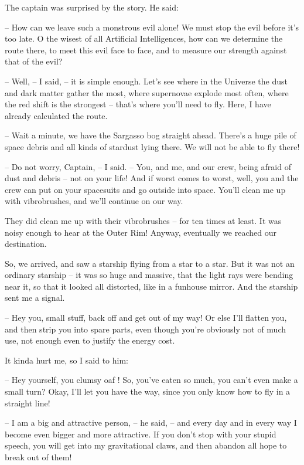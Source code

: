 \documentclass[ebook,oneside,final,openright]{memoir}
\begin{document}
\par
The captain was surprised by the story. He said:\par
– How can we leave such a monstrous evil alone! We must stop the evil before it’s too late. O the wisest of all Artificial Intelligences, how can we determine the route there, to meet this evil face to face, and to measure our strength against that of the evil?\par
– Well, – I said, – it is simple enough. Let’s see where in the Universe the dust and dark matter gather the most, where supernovae explode most often, where the red shift is the strongest – that’s where you’ll need to fly. Here, I have already calculated the route.\par
– Wait a minute, we have the Sargasso bog straight ahead. There’s a huge pile of space debris and all kinds of stardust lying there. We will not be able to fly there!\par
– Do not worry, Captain, – I said. – You, and me, and our crew, being afraid of dust and debris – not on your life! And if worst comes to worst, well, you and the crew can put on your spacesuits and go outside into space. You’ll clean me up with vibrobrushes, and we’ll continue on our way.\par
\par
They did clean me up with their vibrobrushes – for ten times at least. It was noisy enough to hear at the Outer Rim! Anyway, eventually we reached our destination.\par
\par
So, we arrived, and saw a starship flying from a star to a star. But it was not an ordinary starship – it was so huge and massive, that the light rays were bending near it, so that it looked all distorted, like in a funhouse mirror. And the starship sent me a signal.\par
– Hey you, small stuff, back off and get out of my way! Or else I’ll flatten you, and then strip you into spare parts, even though you’re obviously not of much use, not enough even to justify the energy cost.\par
It kinda hurt me, so I said to him:\par
– Hey yourself, you clumsy oaf ! So, you’ve eaten so much, you can’t even make a small turn? Okay, I’ll let you have the way, since you only know how to fly in a straight line!\par
– I am a big and attractive person, – he said, – and every day and in every way I become even bigger and more attractive. If you don’t stop with your stupid speech, you will get into my gravitational claws, and then abandon all hope to break out of them!\par
\end{document}
